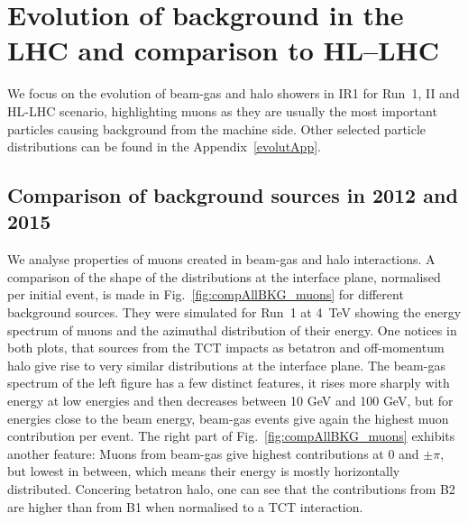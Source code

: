 \newpage
\section{Evolution of background in the LHC and comparison to HL--LHC\label{evolut}}

We focus on the evolution of beam-gas and halo showers in IR1 for Run~1, II and HL-LHC scenario, highlighting muons as they are usually the most important particles causing background from the machine side. Other selected particle distributions can be found in the Appendix~\ref{evolutApp}.

\subsection{Comparison of background sources in 2012 and 2015}


We analyse properties of muons created in beam-gas and halo interactions. A comparison of the shape of the distributions at the interface plane, normalised per initial event, is made in Fig.~\ref{fig:compAllBKG_muons} for different background sources. They were simulated for Run~1 at 4~TeV showing the energy spectrum of muons and the azimuthal distribution of their energy. One notices in both plots, that sources from the TCT impacts as betatron and off-momentum halo give rise to very similar distributions at the interface plane. The beam-gas spectrum of the left figure has a few distinct features, it rises more sharply with energy at low energies and then decreases between 10 GeV and 100 GeV, but for energies close to the beam energy, beam-gas events give again the highest muon contribution per event. The right part of Fig.~\ref{fig:compAllBKG_muons} exhibits another feature: Muons from beam-gas give highest contributions at $0$ and $\pm \pi$, but lowest in between, which means their energy is mostly horizontally distributed. Concering betatron halo, one can see that the contributions from B2 are higher than from B1 when normalised to a TCT interaction.\\

